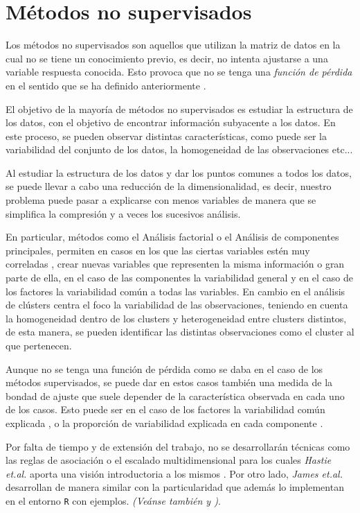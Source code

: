 \chapter{Métodos no supervisados}

\noindent Los métodos no supervisados son aquellos que utilizan la matriz de datos en la cual no se tiene un conocimiento previo, es decir, no intenta ajustarse a una variable respuesta conocida. Esto provoca que no se tenga una \emph{función de pérdida} en el sentido que se ha definido anteriormente \cite{Hastie 2001}. 

\noindent El objetivo de la mayoría de métodos no supervisados es estudiar la estructura de los datos, con el objetivo de encontrar información subyacente a los datos. En este proceso, se pueden observar distintas características, como puede ser la variabilidad del conjunto de los datos, la homogeneidad de las observaciones etc...

\noindent Al estudiar la estructura de los datos y dar los puntos comunes a todos los datos, se puede llevar a cabo una reducción de la dimensionalidad, es decir, nuestro problema puede pasar a explicarse con menos variables de manera que se simplifica la compresión \cite{Abdi 2010} y a veces los sucesivos análisis. 

\noindent En particular, métodos como el Análisis factorial o el Análisis de componentes principales, permiten en casos en los que las ciertas variables estén muy correladas \cite{Everitt 2011}, crear nuevas variables que representen la misma información o gran parte de ella, en el caso de las componentes la variabilidad general y en el caso de los factores la variabilidad común a todas las variables. En cambio en el análisis de clústers centra el foco la variabilidad de las observaciones, teniendo en cuenta la homogeneidad dentro de los clusters y heterogeneidad entre clusters distintos, de esta manera, se pueden identificar las distintas observaciones como el cluster al que pertenecen. 

\noindent Aunque no se tenga una función de pérdida como se daba en el caso de los métodos supervisados, se puede dar en estos casos también una medida de la bondad de ajuste que suele depender de la característica observada en cada uno de los casos. Esto puede ser en el caso de los factores la variabilidad común explicada \cite{Peña 2002}, o la proporción de variabilidad explicada en cada componente \cite{Chatfield 1989}. 

\noindent Por falta de tiempo y de extensión del trabajo, no se desarrollarán técnicas como las reglas de asociación o el escalado multidimensional para los cuales \emph{Hastie et.al.} aporta una visión introductoria a los mismos \cite{Hastie 2001}. Por otro lado, \emph{James et.al.}\cite{James 2013} desarrollan de manera similar con la particularidad  que además lo implementan en el entorno \texttt{R} con ejemplos. \emph{(Veánse también \cite{Everitt 2011} y \cite{Johnson 2007})}.

  


\newpage 

\newpage
